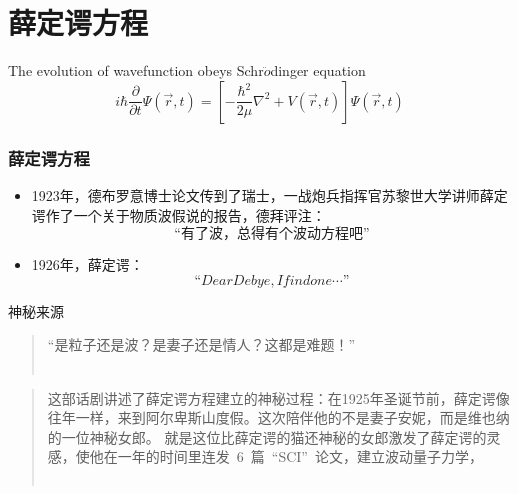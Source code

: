 \section{薛定谔方程}

\begin{frame}
    \begin{tcolorbox4}
        The evolution of wavefunction obeys Schr$\ddot{o}$dinger equation
        \begin{equation*}
            i\hbar \frac{\partial }{\partial t} \Psi (\overrightarrow{r},t ) =\left [ -\frac{\hbar^2}{2\mu }\nabla ^2 + V(\overrightarrow{r},t ) \right ]\Psi (\overrightarrow{r}, t ) 
        \end{equation*}
    \end{tcolorbox4}
\end{frame}

\begin{frame}
    \frametitle{薛定谔方程}
    \begin{itemize}
        \item 1923年，德布罗意博士论文传到了瑞士，一战炮兵指挥官苏黎世大学讲师薛定谔作了一个关于物质波假说的报告，德拜评注：\\
        $$\text{“有了波，总得有个波动方程吧”}$$
        \item 1926年，薛定谔：
        $$“Dear Debye, I find one \cdots”$$
    \end{itemize}            
\end{frame}

\begin{frame}
    \begin{alertblock} {神秘来源}  
    \begin{quote}
        “是粒子还是波？是妻子还是情人？这都是难题！” \\
        ~~\\
    \end{quote}  
    \begin{quote}    
    这部话剧讲述了薛定谔方程建立的神秘过程：在1925年圣诞节前，薛定谔像往年一样，来到阿尔卑斯山度假。这次陪伴他的不是妻子安妮，而是维也纳的一位神秘女郎。
    就是这位比薛定谔的猫还神秘的女郎激发了薛定谔的灵感，使他在一年的时间里连发~6~篇~“SCI”~论文，建立波动量子力学，\ddots\\
    ~~\\
    \end{quote} 
    \end{alertblock}   
\end{frame}

